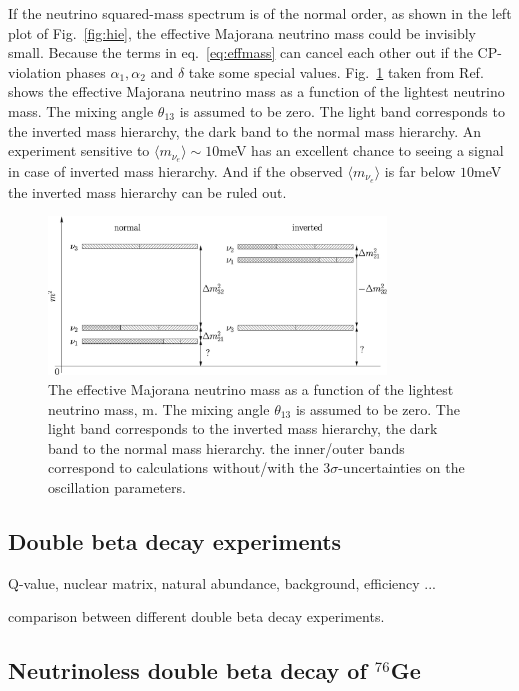 If the neutrino squared-mass spectrum is of the normal order, as shown
in the left plot of Fig.~\ref{fig:hie}, the effective Majorana
neutrino mass could be invisibly small. Because the terms in
eq.~\ref{eq:effmass} can cancel each other out if the CP-violation
phases $\alpha_{1}, \alpha_{2}$ and $\delta$ take some special values.
Fig.~\ref{fig:effmvmm} taken from Ref.~\cite{Mer06} shows the
effective Majorana neutrino mass as a function of the lightest
neutrino mass. The mixing angle $\theta_{13}$ is assumed to be zero.
The light band corresponds to the inverted mass hierarchy, the dark
band to the normal mass hierarchy. An experiment sensitive to $\langle
m_{\nu_{e}} \rangle \sim 10$meV has an excellent chance to seeing a
signal in case of inverted mass hierarchy. And if the observed
$\langle m_{\nu_{e}} \rangle$ is far below $10$meV the inverted mass
hierarchy can be ruled out.
\begin{figure}[tbhp]
  \centering
  \includegraphics[width=0.8\textwidth]{massHierarchy.eps}  
  \caption{The effective Majorana neutrino mass as a function of the
lightest neutrino mass, m. The mixing angle $\theta_{13}$ is assumed
to be zero. The light band corresponds to the inverted mass hierarchy,
the dark band to the normal mass hierarchy. the inner/outer bands
correspond to calculations without/with the $3\sigma$-uncertainties on
the oscillation parameters. }
  \label{fig:effmvmm}
\end{figure}

\subsection{Double beta decay experiments}
\label{sec:genremark}
Q-value, nuclear matrix, natural abundance, background, efficiency ...

comparison between different double beta decay experiments.

\subsection{Neutrinoless double beta decay of $^{76}$Ge}
\label{sec:ge76}


